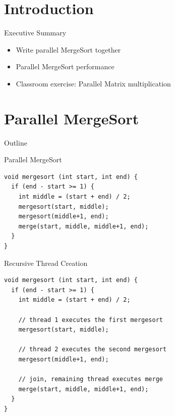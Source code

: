 \section*{Introduction}

\begin{frame}{Executive Summary}
  \begin{itemize}
  \item Write parallel MergeSort together
  \item Parallel MergeSort performance
  \item Classroom exercise: Parallel Matrix multiplication
  \end{itemize}
\end{frame}


\section{Parallel MergeSort}

\begin{frame}{Outline}
  \tableofcontents[current]
\end{frame}

\begin{frame}[fragile]{Parallel MergeSort}
\begin{lstlisting}
void mergesort (int start, int end) {
  if (end - start >= 1) {
    int middle = (start + end) / 2;
    mergesort(start, middle);
    mergesort(middle+1, end);
    merge(start, middle, middle+1, end);
  }
}
\end{lstlisting}
\end{frame}

\begin{frame}[fragile]{Recursive Thread Creation}
\begin{lstlisting}
void mergesort (int start, int end) {
  if (end - start >= 1) {
    int middle = (start + end) / 2;

    // thread 1 executes the first mergesort
    mergesort(start, middle);

    // thread 2 executes the second mergesort
    mergesort(middle+1, end);

    // join, remaining thread executes merge
    merge(start, middle, middle+1, end);
  }
}
\end{lstlisting}
\end{frame}


